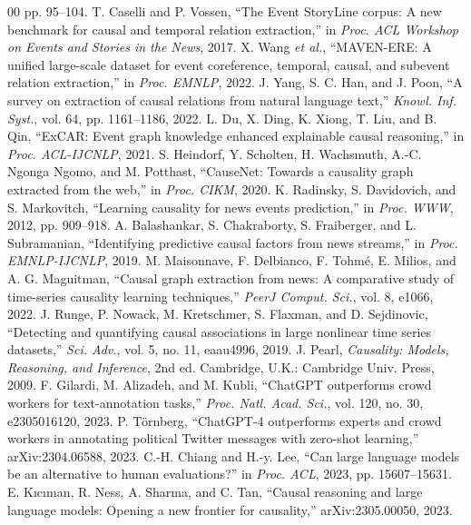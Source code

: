 \documentclass[conference]{IEEEtran}
\begin{document}
\begin{thebibliography}{00}
pp. 95--104.
 T. Caselli and P. Vossen, ``The Event StoryLine corpus: A new benchmark for
causal and temporal relation extraction,'' in \textit{Proc. ACL Workshop on Events and Stories in
the News}, 2017.
 X. Wang \textit{et al.}, ``MAVEN-ERE: A unified large-scale dataset for event
coreference, temporal, causal, and subevent relation extraction,'' in \textit{Proc. EMNLP}, 2022.
 J. Yang, S. C. Han, and J. Poon, ``A survey on extraction of causal relations
from natural language text,'' \textit{Knowl. Inf. Syst.}, vol. 64, pp. 1161--1186, 2022.
 L. Du, X. Ding, K. Xiong, T. Liu, and B. Qin, ``ExCAR: Event graph knowledge enhanced
explainable causal reasoning,'' in \textit{Proc. ACL-IJCNLP}, 2021.
 S. Heindorf, Y. Scholten, H. Wachsmuth, A.-C. Ngonga Ngomo, and M. Potthast,
``CauseNet: Towards a causality graph extracted from the web,'' in \textit{Proc. CIKM}, 2020.
 K. Radinsky, S. Davidovich, and S. Markovitch, ``Learning causality for news
events prediction,'' in \textit{Proc. WWW}, 2012, pp. 909--918.
 A. Balashankar, S. Chakraborty, S. Fraiberger, and L. Subramanian,
``Identifying predictive causal factors from news streams,'' in \textit{Proc. EMNLP-IJCNLP}, 2019.
 M. Maisonnave, F. Delbianco, F. Tohm\'{e}, E. Milios, and A. G. Maguitman,
``Causal graph extraction from news: A comparative study of time-series causality learning
techniques,'' \textit{PeerJ Comput. Sci.}, vol. 8, e1066, 2022.
 J. Runge, P. Nowack, M. Kretschmer, S. Flaxman, and D. Sejdinovic, ``Detecting and
quantifying causal associations in large nonlinear time series datasets,'' \textit{Sci. Adv.},
vol. 5, no. 11, eaau4996, 2019.
 J. Pearl, \textit{Causality: Models, Reasoning, and Inference}, 2nd ed. Cambridge,
U.K.: Cambridge Univ. Press, 2009.
 F. Gilardi, M. Alizadeh, and M. Kubli, ``ChatGPT outperforms crowd workers for
text-annotation tasks,'' \textit{Proc. Natl. Acad. Sci.}, vol. 120, no. 30, e2305016120, 2023.
 P. T\"{o}rnberg, ``ChatGPT-4 outperforms experts and crowd workers in annotating
political Twitter messages with zero-shot learning,'' arXiv:2304.06588, 2023.
 C.-H. Chiang and H.-y. Lee, ``Can large language models be an alternative to human
evaluations?'' in \textit{Proc. ACL}, 2023, pp. 15607--15631.
 E. K\i{}c\i{}man, R. Ness, A. Sharma, and C. Tan, ``Causal reasoning and large
language models: Opening a new frontier for causality,'' arXiv:2305.00050, 2023.

\end{thebibliography}
\end{document}
